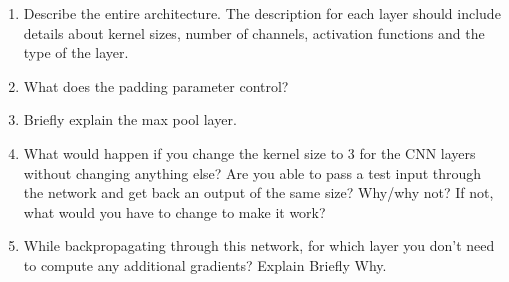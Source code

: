 \documentclass[answers]{exam}
\begin{document}
\begin{enumerate}
\item Describe the entire architecture. The description for each layer should include details about kernel sizes, number of channels,  activation functions and the type of the layer. 

\item What does the padding parameter control?

\item Briefly explain the max pool layer.

\item What would happen if you change the kernel size to 3 for the CNN layers without changing anything else? Are you able to pass a test input through the network and get back an output of the same size? Why/why not? If not, what would you have to change to make it work?

\item While backpropagating through this network, for which layer you don't need to compute any additional gradients? Explain Briefly Why. 
\end{enumerate}
\end{document}
